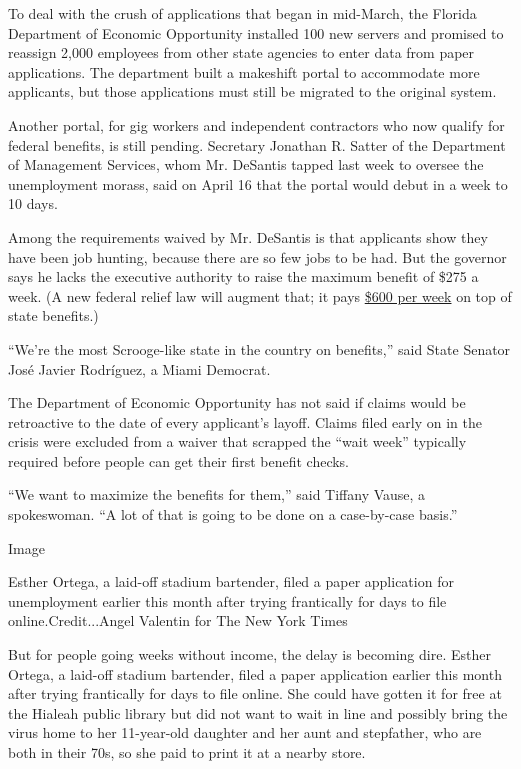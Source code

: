 To deal with the crush of applications that began in mid-March, the
Florida Department of Economic Opportunity installed 100 new servers and
promised to reassign 2,000 employees from other state agencies to enter
data from paper applications. The department built a makeshift portal to
accommodate more applicants, but those applications must still be
migrated to the original system.

Another portal, for gig workers and independent contractors who now
qualify for federal benefits, is still pending. Secretary Jonathan R.
Satter of the Department of Management Services, whom Mr. DeSantis
tapped last week to oversee the unemployment morass, said on April 16
that the portal would debut in a week to 10 days.

Among the requirements waived by Mr. DeSantis is that applicants show
they have been job hunting, because there are so few jobs to be had. But
the governor says he lacks the executive authority to raise the maximum
benefit of \$275 a week. (A new federal relief law will augment that; it
pays
\href{https://slack-redir.net/link?url=https\%3A\%2F\%2Fwww.nytimes.com\%2Finteractive\%2F2020\%2F04\%2F23\%2Fbusiness\%2Feconomy\%2Funemployment-benefits-stimulus-coronavirus.html}{\$600
per week} on top of state benefits.)

``We're the most Scrooge-like state in the country on benefits,'' said
State Senator José Javier Rodríguez, a Miami Democrat.

The Department of Economic Opportunity has not said if claims would be
retroactive to the date of every applicant's layoff. Claims filed early
on in the crisis were excluded from a waiver that scrapped the ``wait
week'' typically required before people can get their first benefit
checks.

``We want to maximize the benefits for them,'' said Tiffany Vause, a
spokeswoman. ``A lot of that is going to be done on a case-by-case
basis.''

Image

Esther Ortega, a laid-off stadium bartender, filed a paper application
for unemployment earlier this month after trying frantically for days to
file online.Credit...Angel Valentin for The New York Times

But for people going weeks without income, the delay is becoming dire.
Esther Ortega, a laid-off stadium bartender, filed a paper application
earlier this month after trying frantically for days to file online. She
could have gotten it for free at the Hialeah public library but did not
want to wait in line and possibly bring the virus home to her
11-year-old daughter and her aunt and stepfather, who are both in their
70s, so she paid to print it at a nearby store.

